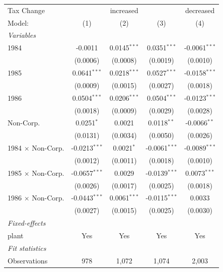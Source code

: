 \documentclass[
  12pt]{article}
\theoremstyle{definition}
\theoremstyle{remark}
\begin{document}
\begin{table}
\begin{minipage}{\linewidth}
\begin{tabular}{lcccc}
   Tax Change & \multicolumn{3}{c}{increased} & decreased \\ 
   Model:                   & (1)             & (2)            & (3)             & (4)\\  
   \midrule
   \emph{Variables}\\
   1984                     & -0.0011         & 0.0145$^{***}$ & 0.0351$^{***}$  & -0.0061$^{***}$\\   
                            & (0.0006)        & (0.0008)       & (0.0019)        & (0.0010)\\   
   1985                     & 0.0641$^{***}$  & 0.0218$^{***}$ & 0.0527$^{***}$  & -0.0158$^{***}$\\   
                            & (0.0009)        & (0.0015)       & (0.0027)        & (0.0018)\\   
   1986                     & 0.0504$^{***}$  & 0.0206$^{***}$ & 0.0504$^{***}$  & -0.0123$^{***}$\\   
                            & (0.0018)        & (0.0009)       & (0.0029)        & (0.0028)\\   
   Non-Corp.                & 0.0251$^{*}$    & 0.0021         & 0.0118$^{**}$   & -0.0066$^{**}$\\   
                            & (0.0131)        & (0.0034)       & (0.0050)        & (0.0026)\\   
   1984 $\times$ Non-Corp.  & -0.0213$^{***}$ & 0.0021$^{*}$   & -0.0061$^{***}$ & -0.0089$^{***}$\\   
                            & (0.0012)        & (0.0011)       & (0.0018)        & (0.0010)\\   
   1985 $\times$ Non-Corp.  & -0.0657$^{***}$ & 0.0029         & -0.0139$^{***}$ & 0.0073$^{***}$\\   
                            & (0.0026)        & (0.0017)       & (0.0025)        & (0.0018)\\   
   1986 $\times$ Non-Corp.  & -0.0443$^{***}$ & 0.0061$^{***}$ & -0.0115$^{***}$ & 0.0033\\   
                            & (0.0027)        & (0.0015)       & (0.0025)        & (0.0030)\\   
   \midrule
   \emph{Fixed-effects}\\
   plant                    & Yes             & Yes            & Yes             & Yes\\  
   \midrule
   \emph{Fit statistics}\\
   Observations             & 978             & 1,072          & 1,074           & 2,003\\  

\end{tabular}
\end{minipage}
\end{table}
\end{document}
